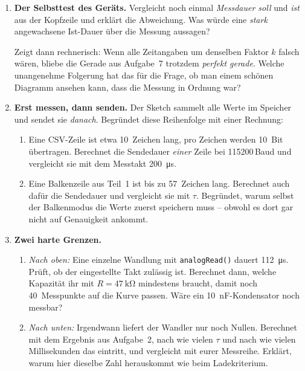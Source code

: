 \documentclass[a4paper,12pt]{scrartcl}
\begin{document}
\begin{enumerate}[leftmargin=2em, resume, itemsep=13pt, topsep=9pt]
\item \textbf{Der Selbsttest des Geräts.} Vergleicht noch einmal \emph{Messdauer soll} und
\emph{ist} aus der Kopfzeile und erklärt die Abweichung. Was würde eine \emph{stark} angewachsene
Ist-Dauer über die Messung aussagen?

\smallskip
Zeigt dann rechnerisch: Wenn alle Zeitangaben um denselben Faktor $k$ falsch wären, bliebe die
Gerade aus Aufgabe~7 trotzdem \emph{perfekt gerade}. Welche unangenehme Folgerung hat das für die
Frage, ob man einem schönen Diagramm ansehen kann, dass die Messung in Ordnung war?

\item \textbf{Erst messen, dann senden.} Der Sketch sammelt alle Werte im Speicher und sendet sie
\emph{danach}. Begründet diese Reihenfolge mit einer Rechnung:
  \begin{enumerate}[label=(\alph*), leftmargin=2em, itemsep=7pt, topsep=6pt]
  \item Eine CSV-Zeile ist etwa 10~Zeichen lang, pro Zeichen werden 10~Bit übertragen. Berechnet
        die Sendedauer \emph{einer} Zeile bei 115200\,Baud und vergleicht sie mit dem Messtakt
        \SI{200}{\micro\second}.
  \item Eine Balkenzeile aus Teil~1 ist bis zu 57~Zeichen lang. Berechnet auch dafür die
        Sendedauer und vergleicht sie mit $\tau$. Begründet, warum selbst der Balkenmodus die
        Werte zuerst speichern muss -- obwohl es dort gar nicht auf Genauigkeit ankommt.
  \end{enumerate}

\item \textbf{Zwei harte Grenzen.}
  \begin{enumerate}[label=(\alph*), leftmargin=2em, itemsep=7pt, topsep=6pt]
  \item \emph{Nach oben:} Eine einzelne Wandlung mit \texttt{analogRead()} dauert
        \SI{112}{\micro\second}. Prüft, ob der eingestellte Takt zulässig ist. Berechnet dann,
        welche Kapazität ihr mit $R=\SI{47}{\kilo\ohm}$ mindestens braucht, damit noch
        40~Messpunkte auf die Kurve passen. Wäre ein \SI{10}{\nano\farad}-Kondensator noch messbar?
  \item \emph{Nach unten:} Irgendwann liefert der Wandler nur noch Nullen. Berechnet mit dem
        Ergebnis aus Aufgabe~2, nach wie vielen $\tau$ und nach wie vielen Millisekunden das
        eintritt, und vergleicht mit eurer Messreihe. Erklärt, warum hier dieselbe Zahl
        herauskommt wie beim Ladekriterium.
  \end{enumerate}


\end{enumerate}
\end{document}
